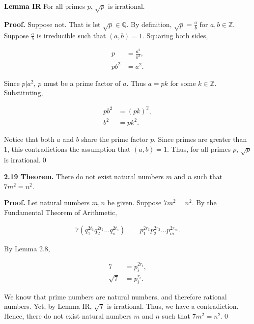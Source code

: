 \documentclass[12pt]{article}
\begin{document}
\noindent\textbf{Lemma IR} For all primes $p$, $\sqrt{p}$ is irrational.

\bigskip

\noindent\textbf{Proof.} Suppose not. That is let $\sqrt{p}\in\mathbb{Q}$. By definition, $\sqrt{p}=\frac{a}{b}$ for $a,b\in\mathbb{Z}$. Suppose $\frac{a}{b}$ is irreducible such that $(a,b)=1$. Squaring both sides, 

\begin{align*}
p &= \frac{a^2}{b^2}, \\
pb^2 &= a^2.
\end{align*}

\noindent Since $p|a^2$, $p$ must be a prime factor of $a$. Thus $a=pk$ for some $k\in\mathbb{Z}$. Substituting,

\begin{align*}
pb^2 &= (pk)^2, \\
b^2 &= pk^2.
\end{align*}

\noindent Notice that both $a$ and $b$ share the prime factor $p$. Since primes are greater than 1, this contradictions the assumption that $(a,b)=1$. Thus, for all primes $p$, $\sqrt{p}$ is irrational.\qed

\bigskip

\noindent\textbf{2.19 Theorem.} There do not exist natural numbers $m$ and $n$ such that $7m^2=n^2$.

\bigskip

\noindent\textbf{Proof.} Let natural numbers $m,n$ be given. Suppose $7m^2=n^2$. By the Fundamental Theorem of Arithmetic,

\begin{align*}
7(q_{1}^{2t_{1}}q_{2}^{2t_{2}}...q_{s}^{2t_{s}}) &= p_{1}^{2r_{1}}p_{2}^{2r_{2}}...p_{m}^{2r_{m}}.
\end{align*}

\noindent By Lemma 2.8,

\begin{align*}
7 &= p_{i}^{2r_{i}}, \\
\sqrt{7} &= p_{i}^{r_{i}}.
\end{align*}

\noindent We know that prime numbers are natural numbers, and therefore rational numbers. Yet, by Lemma IR, $\sqrt{7}$ is irrational. Thus, we have a contradiction. Hence, there do not exist natural numbers $m$ and $n$ such that $7m^2=n^2$.\qed
\end{document}
